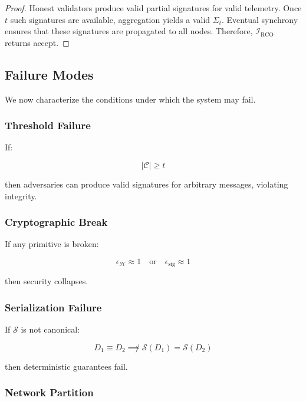 \begin{proof}
Honest validators produce valid partial signatures for valid telemetry. Once $t$ such signatures are available, aggregation yields a valid $\Sigma_t$. Eventual synchrony ensures that these signatures are propagated to all nodes. Therefore, $\mathcal{I}_{\text{RCO}}$ returns accept.
\end{proof}

\subsection{Failure Modes}

We now characterize the conditions under which the system may fail.

\subsubsection{Threshold Failure}

If:

\begin{equation}
|\mathcal{C}| \geq t
\end{equation}

then adversaries can produce valid signatures for arbitrary messages, violating integrity.

\subsubsection{Cryptographic Break}

If any primitive is broken:

\begin{equation}
\epsilon_{\mathcal{H}} \approx 1 \quad \text{or} \quad \epsilon_{\text{sig}} \approx 1
\end{equation}

then security collapses.

\subsubsection{Serialization Failure}

If $\mathcal{S}$ is not canonical:

\begin{equation}
D_1 \equiv D_2 \not\implies \mathcal{S}(D_1) = \mathcal{S}(D_2)
\end{equation}

then deterministic guarantees fail.

\subsubsection{Network Partition}

